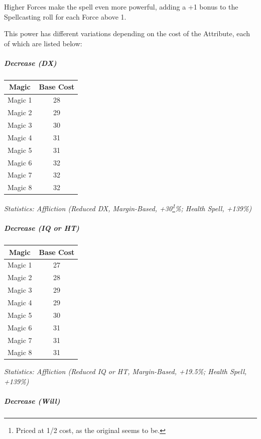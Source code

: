 \begin{multicols*}{3}
	Higher Forces make the spell even more powerful, adding a +1 bonus to the Spellcasting roll for each Force above 1.
	
	This power has different variations depending on the cost of the Attribute, each of which are listed below:
	
	\subparagraph{Decrease (DX)}
	
	\begin{center}
		\begin{tabular}{|c|c|}
			\hline
			Magic & Base Cost \\
			\hline
			\hline
			Magic 1 & 28 \\
			Magic 2 & 29 \\
			Magic 3 & 30 \\
			Magic 4 & 31 \\
			Magic 5 & 31 \\
			Magic 6 & 32 \\
			Magic 7 & 32 \\
			Magic 8 & 32 \\
			\hline
		\end{tabular}
	\end{center}	
	
	\textcolor{OliveGreen}{\textit{Statistics: Affliction (Reduced DX, Margin-Based, +30\footnote{Priced at 1/2 cost, as the original seems to be.}\%; Health Spell, +139\%) }}
	
	\subparagraph{Decrease (IQ or HT)}
	
	\begin{center}
		\begin{tabular}{|c|c|}
			\hline
			Magic & Base Cost \\
			\hline
			\hline
			Magic 1 & 27 \\
			Magic 2 & 28 \\
			Magic 3 & 29  \\
			Magic 4 & 29 \\
			Magic 5 & 30 \\
			Magic 6 & 31 \\
			Magic 7 & 31 \\
			Magic 8 & 31 \\
			\hline
		\end{tabular}
	\end{center}	
	
	\textcolor{OliveGreen}{\textit{Statistics: Affliction (Reduced IQ or HT, Margin-Based, +19.5\%; Health Spell, +139\%) }}
	
	\subparagraph{Decrease (Will)}
	

\end{multicols*}
